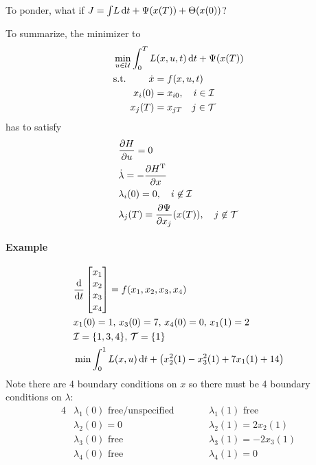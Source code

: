To ponder, what if $J=\int\! L\mathop{}\!\mathrm{d} t + \Psi(x(T)) + \Theta(x(0))$?

To summarize, the minimizer to
\begin{align}
  & \min_{u\in\mathcal U} \int_0^T L(x,u,t)\mathop{}\!\mathrm{d} t + \Psi(x(T)) \\
  & \text{s.t. } \begin{aligned}[t]
    \dot x &= f(x,u,t) \\
    x_i(0) &= x_{i0}, \quad i\in\mathcal I \\
    x_j(T) &= x_{jT} \quad j\in\mathcal T
  \end{aligned}
\end{align}
has to satisfy
\begin{align}
  & \frac{\partial H}{\partial u} = 0 \\
  & \dot\lambda = -\frac{\partial H^\text{T}}{\partial x} \\
  & \lambda_i(0) = 0, \quad i\not\in\mathcal I \\
  & \lambda_j(T) = \frac{\partial \Psi}{\partial x_j}(x(T)), \quad j\not\in\mathcal T
\end{align}

\paragraph{Example}
\begin{align}
  & \frac{\mathop{}\!\mathrm{d}}{\mathop{}\!\mathrm{d} t} \begin{bmatrix}
    x_1 \\ x_2 \\ x_3 \\ x_4
  \end{bmatrix} = f(x_1,x_2,x_3,x_4) \\
  & x_1(0)=1,\, x_3(0)=7,\, x_4(0)=0,\, x_1(1)=2 \\
  & \mathcal I = \{1,3,4\},\, \mathcal T = \{1\} \\
  & \min \int_0^1 L(x,u)\mathop{}\!\mathrm{d} t + \big(x_2^2(1) - x_3^2(1) + 7x_1(1) + 14 \big)
\end{align}
Note there are 4 boundary conditions on $x$ so there must be 4 boundary conditions on $\lambda$:
\begin{alignat}{4}
  & \lambda_1(0) \text{ free/unspecified} & \qquad & \lambda_1(1) \text{ free} \\
  & \lambda_2(0) = 0 && \lambda_2(1) = 2x_2(1) \\
  & \lambda_3(0) \text{ free} && \lambda_3(1) = -2x_3(1) \\
  & \lambda_4(0) \text{ free} && \lambda_4(1) = 0
\end{alignat}

